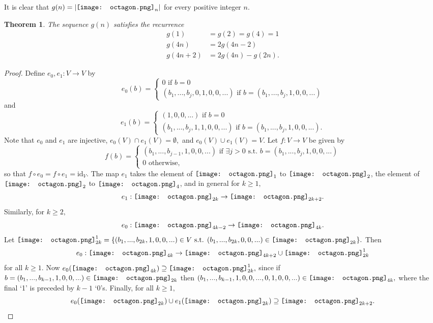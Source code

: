 \documentclass[12pt]{amsart}
\newcommand*\oct{\vcenter{\hbox{\texttt{[image: octagon.png]}}}}
\newtheorem{theorem}{Theorem}
\theoremstyle{definition}
\begin{document}
It is clear that $g(n) = |\oct_n|$ for every positive integer $n$.

\begin{theorem}
    The sequence $g(n)$ satisfies the recurrence
    \begin{align*}
        g(1) &= g(2) = g(4) = 1 \\
        g(4n) &= 2 g(4n - 2) \\
        g(4n + 2) &= 2 g(4n) - g(2n).
    \end{align*}
\end{theorem}

\begin{proof}
Define $e_0, e_1 : V \to V$ by
$$e_0(b) = \begin{cases} 0 \text{ if } b=0 \\ (b_1, ..., b_j, 0, 1, 0,0,...) \text{ if } b = (b_1, ..., b_j, 1, 0, 0, ...) \end{cases} $$
and
$$e_1(b) = \begin{cases} (1, 0,0,...) \text{ if } b=0 \\ (b_1, ..., b_j, 1, 1, 0,0,...) \text{ if } b=(b_1, ..., b_j, 1, 0, 0, ...). \end{cases} $$
Note that $e_0$ and $e_1$ are injective, $e_0(V) \cap e_1(V) = \emptyset,$ and $e_0(V) \cup e_1(V) = V.$
Let
$f:V \to V$
be given by
$$f(b) = \begin{cases} (b_1, ..., b_{j-1}, 1, 0,0,...) \text{ if } \exists j>0 \text{ s.t. } b = (b_1, ..., b_j, 1, 0,0,...) \\ 0 \text{ otherwise,} \end{cases}$$
so that $f \circ e_0 = f \circ e_1 = \text{id}_V.$
The map $e_1$ takes the element of $\oct_1$ to $\oct_2$, the element of $\oct_2$ to $\oct_4$, and in general for $k \geq 1,$
$$e_1 : \oct_{2k} \to \oct_{2k+2}.$$
Similarly, for $k \geq 2,$
$$e_0 : \oct_{4k-2} \to \oct_{4k}.$$
Let $\oct_{2k}^1 = \{(b_1, ..., b_{2k}, 1, 0,0,...) \in V \text{ s.t. } (b_1,...,b_{2k},0,0,...) \in \oct_{2k}\}.$
Then
$$e_0 : \oct_{4k} \to \oct_{4k+2} \cup \oct_{2k}^1$$
for all $k \geq 1.$
Now $e_0(\oct_{4k}) \supseteq \oct_{2k}^1,$ since if $b = (b_1, ..., b_{k-1}, 1, 0,0,...) \in \oct_{2k}$ then $(b_1, ..., b_{k-1}, 1, 0,0,...,0,1,0,0,...) \in \oct_{4k},$
where the final `1' is preceded by $k-1$ `0's.  
Finally, for all $k \geq 1,$
$$ e_0(\oct_{2k}) \cup e_1(\oct_{2k}) \supseteq \oct_{2k+2}.$$
\end{proof}
\end{document}
